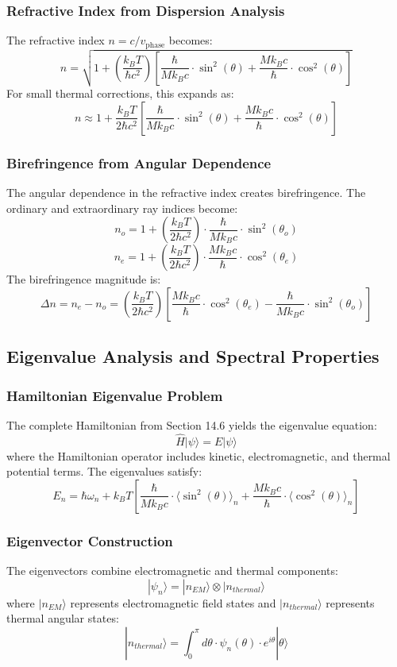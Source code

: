 ﻿\documentclass[12pt]{article}
\begin{document}
\subsubsection{Refractive Index from Dispersion Analysis}
The refractive index $n = c/v_{\text{phase}}$ becomes:
$$n = \sqrt{1 + \left(\frac{k_B T}{\hbar c^2}\right)\left[\frac{\hbar}{Mk_Bc}\cdot\sin^2(\theta) + \frac{Mk_Bc}{\hbar}\cdot\cos^2(\theta)\right]}$$
For small thermal corrections, this expands as:
$$n \approx 1 + \frac{k_B T}{2\hbar c^2}\left[\frac{\hbar}{Mk_Bc}\cdot\sin^2(\theta) + \frac{Mk_Bc}{\hbar}\cdot\cos^2(\theta)\right]$$

\subsubsection{Birefringence from Angular Dependence}
The angular dependence in the refractive index creates birefringence. The ordinary and extraordinary ray indices become:
$$n_o = 1 + \left(\frac{k_B T}{2\hbar c^2}\right) \cdot \frac{\hbar}{Mk_Bc} \cdot \sin^2(\theta_o)$$
$$n_e = 1 + \left(\frac{k_B T}{2\hbar c^2}\right) \cdot \frac{Mk_Bc}{\hbar} \cdot \cos^2(\theta_e)$$
The birefringence magnitude is:
$$\Delta n = n_e - n_o = \left(\frac{k_B T}{2\hbar c^2}\right)\left[\frac{Mk_Bc}{\hbar} \cdot \cos^2(\theta_e) - \frac{\hbar}{Mk_Bc} \cdot \sin^2(\theta_o)\right]$$

\subsection{Eigenvalue Analysis and Spectral Properties}

\subsubsection{Hamiltonian Eigenvalue Problem}
The complete Hamiltonian from Section 14.6 yields the eigenvalue equation:
$$\hat{H}|\psi\rangle = E|\psi\rangle$$
where the Hamiltonian operator includes kinetic, electromagnetic, and thermal potential terms. The eigenvalues satisfy:
$$E_n = \hbar\omega_n + k_B T\left[\frac{\hbar}{Mk_Bc} \cdot \langle\sin^2(\theta)\rangle_n + \frac{Mk_Bc}{\hbar} \cdot \langle\cos^2(\theta)\rangle_n\right]$$

\subsubsection{Eigenvector Construction}
The eigenvectors combine electromagnetic and thermal components:
$$|\psi_n\rangle = |n_{EM}\rangle \otimes |n_{thermal}\rangle$$
where $|n_{EM}\rangle$ represents electromagnetic field states and $|n_{thermal}\rangle$ represents thermal angular states:
$$|n_{thermal}\rangle = \int_0^\pi d\theta \cdot \psi_n(\theta) \cdot e^{i\theta}|\theta\rangle$$
\end{document}
